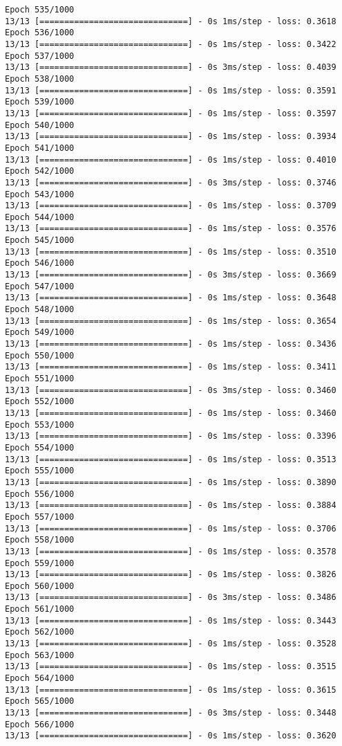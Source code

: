 \documentclass[11pt]{article}
\begin{document}
\begin{Verbatim}[commandchars=\\\{\}]
Epoch 535/1000
13/13 [==============================] - 0s 1ms/step - loss: 0.3618
Epoch 536/1000
13/13 [==============================] - 0s 1ms/step - loss: 0.3422
Epoch 537/1000
13/13 [==============================] - 0s 3ms/step - loss: 0.4039
Epoch 538/1000
13/13 [==============================] - 0s 1ms/step - loss: 0.3591
Epoch 539/1000
13/13 [==============================] - 0s 1ms/step - loss: 0.3597
Epoch 540/1000
13/13 [==============================] - 0s 1ms/step - loss: 0.3934
Epoch 541/1000
13/13 [==============================] - 0s 1ms/step - loss: 0.4010
Epoch 542/1000
13/13 [==============================] - 0s 3ms/step - loss: 0.3746
Epoch 543/1000
13/13 [==============================] - 0s 1ms/step - loss: 0.3709
Epoch 544/1000
13/13 [==============================] - 0s 1ms/step - loss: 0.3576
Epoch 545/1000
13/13 [==============================] - 0s 1ms/step - loss: 0.3510
Epoch 546/1000
13/13 [==============================] - 0s 3ms/step - loss: 0.3669
Epoch 547/1000
13/13 [==============================] - 0s 1ms/step - loss: 0.3648
Epoch 548/1000
13/13 [==============================] - 0s 1ms/step - loss: 0.3654
Epoch 549/1000
13/13 [==============================] - 0s 1ms/step - loss: 0.3436
Epoch 550/1000
13/13 [==============================] - 0s 1ms/step - loss: 0.3411
Epoch 551/1000
13/13 [==============================] - 0s 3ms/step - loss: 0.3460
Epoch 552/1000
13/13 [==============================] - 0s 1ms/step - loss: 0.3460
Epoch 553/1000
13/13 [==============================] - 0s 1ms/step - loss: 0.3396
Epoch 554/1000
13/13 [==============================] - 0s 1ms/step - loss: 0.3513
Epoch 555/1000
13/13 [==============================] - 0s 1ms/step - loss: 0.3890
Epoch 556/1000
13/13 [==============================] - 0s 1ms/step - loss: 0.3884
Epoch 557/1000
13/13 [==============================] - 0s 1ms/step - loss: 0.3706
Epoch 558/1000
13/13 [==============================] - 0s 1ms/step - loss: 0.3578
Epoch 559/1000
13/13 [==============================] - 0s 1ms/step - loss: 0.3826
Epoch 560/1000
13/13 [==============================] - 0s 3ms/step - loss: 0.3486
Epoch 561/1000
13/13 [==============================] - 0s 1ms/step - loss: 0.3443
Epoch 562/1000
13/13 [==============================] - 0s 1ms/step - loss: 0.3528
Epoch 563/1000
13/13 [==============================] - 0s 1ms/step - loss: 0.3515
Epoch 564/1000
13/13 [==============================] - 0s 1ms/step - loss: 0.3615
Epoch 565/1000
13/13 [==============================] - 0s 3ms/step - loss: 0.3448
Epoch 566/1000
13/13 [==============================] - 0s 1ms/step - loss: 0.3620

\end{Verbatim}
\end{document}
